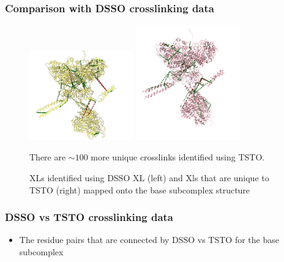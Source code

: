 \documentclass[a4paper,8pt]{beamer}
\begin{document}
\begin{frame}
  \frametitle{Comparison with DSSO crosslinking data}
  \begin{figure}
  \centering
  \includegraphics[width=0.4\textwidth]{figures/dsso-mapped-xls.png}
  \includegraphics[width=0.4\textwidth]{test-figures/unique_to_tsto.png}
  \caption{XLs identified using DSSO XL (left) and Xls that are unique to TSTO (right) mapped onto the base subcomplex structure}
  There are $\sim 100$ more unique crosslinks identified using TSTO.
  \end{figure}
  \end{frame}
\begin{frame}
\frametitle{DSSO vs TSTO crosslinking data}
\begin{itemize}
\item The residue pairs that are connected by DSSO vs TSTO for the 
base subcomplex
\end{itemize}
  \end{frame}
\end{document}

